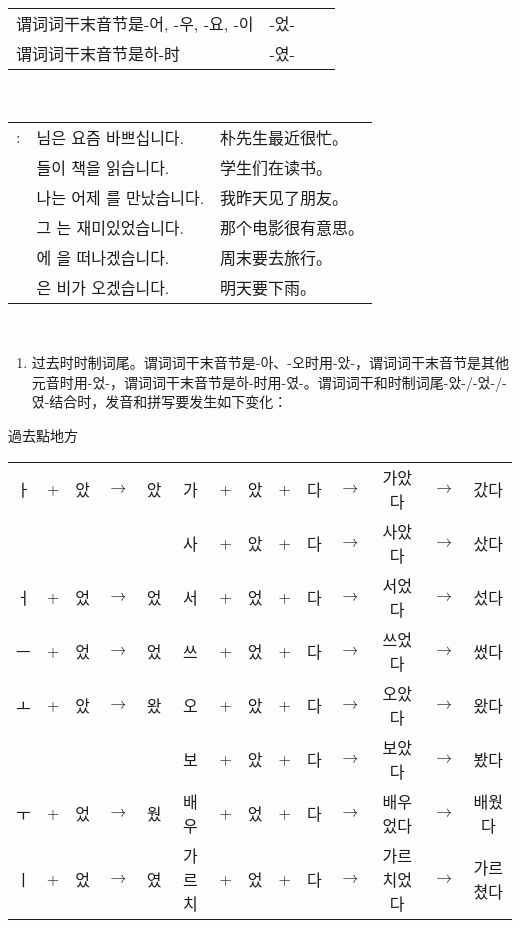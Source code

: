 \begin{grammar}
\begin{grammarsect}[时制]
\begin{tabular}{|l|c|c|c|}
			谓词词干末音节是-어, -우, -요, -이                 & -었- &                       &                      \\\cline{1-2}
			谓词词干末音节是하-时                            & -였- &                       &                      \\\hline
		\end{tabular}\\
		\begin{tabular}{lll}
			\ruby{例}{예}: & \ruby{朴}{박} \ruby{先生}{선생}님은 요즘 바쁘십니다. & 朴先生最近很忙。  \\
			             & \ruby{學生}{학생}들이 \ruby{冊}{책}책을 읽습니다.   & 学生们在读书。   \\
			             & 나는 어제 \ruby{親舊}{친구}를 만났습니다.           & 我昨天见了朋友。  \\
			             & 그 \ruby{映畫}{영화}는 재미있었습니다.             & 那个电影很有意思。 \\
			             & \ruby{週末}{주말}에 \ruby{旅行}{여행}을 떠나겠습니다. & 周末要去旅行。   \\
			             & \ruby{來日}{내일}은 비가 오겠습니다.              & 明天要下雨。
		\end{tabular}\\
	\end{grammarsect}
	\begin{grammarsect}[-았-/-었-/-였-]
		\begin{enumerate}
			\item 过去时时制词尾。谓词词干末音节是-아、-오时用-았-，谓词词干末音节是其他元音时用-었-，谓词词干末音节是하-时用-였-。谓词词干和时制词尾-았-/-었-/-였-结合时，发音和拼写要发生如下变化：
		\end{enumerate}
		{\color{white} 過去點地方}
		\begin{tabular}{|ccccc|ccccccccc|}
			\hline
			ㅏ & + & 았 & $\to$ & 았 & 가   & + & 았 & + & 다 & $\to$ & 가았다   & $\to$ & 갔다   \\
			  &   &   &       &   & 사   & + & 았 & + & 다 & $\to$ & 사았다   & $\to$ & 샀다   \\
			ㅓ & + & 었 & $\to$ & 었 & 서   & + & 었 & + & 다 & $\to$ & 서었다   & $\to$ & 섰다   \\
			ㅡ & + & 었 & $\to$ & 었 & 쓰   & + & 었 & + & 다 & $\to$ & 쓰었다   & $\to$ & 썼다   \\\hline
			ㅗ & + & 았 & $\to$ & 왔 & 오   & + & 았 & + & 다 & $\to$ & 오았다   & $\to$ & 왔다   \\
			  &   &   &       &   & 보   & + & 았 & + & 다 & $\to$ & 보았다   & $\to$ & 봤다   \\
			ㅜ & + & 었 & $\to$ & 웠 & 배우  & + & 었 & + & 다 & $\to$ & 배우었다  & $\to$ & 배웠다  \\
			ㅣ & + & 었 & $\to$ & 였 & 가르치 & + & 었 & + & 다 & $\to$ & 가르치었다 & $\to$ & 가르쳤다 \\\hline
		\end{tabular}\\


\end{grammarsect}
\end{grammar}
